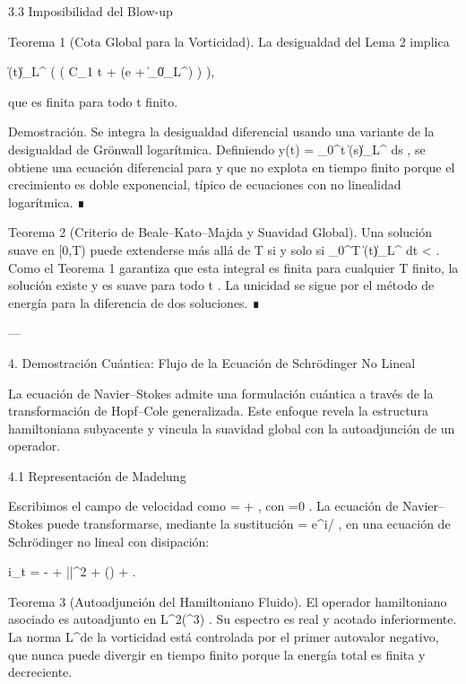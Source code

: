 \documentclass[12pt,twoside]{book}
\begin{document}
3.3 Imposibilidad del Blow-up

Teorema 1 (Cota Global para la Vorticidad).
La desigualdad del Lema 2 implica

\|\boldsymbol{\omega}(t)\|_{L^\infty} \le \exp\left( \exp\left( C_1 t + \ln\ln(e + \|\boldsymbol{\omega}_0\|_{L^\infty}) \right) \right),

que es finita para todo  t  finito.

Demostración. Se integra la desigualdad diferencial usando una variante de la desigualdad de Grönwall logarítmica. Definiendo  y(t) = \int_0^t \|\boldsymbol{\omega}(s)\|_{L^\infty} ds , se obtiene una ecuación diferencial para  y  que no explota en tiempo finito porque el crecimiento es doble exponencial, típico de ecuaciones con no linealidad logarítmica. ∎

Teorema 2 (Criterio de Beale–Kato–Majda y Suavidad Global).
Una solución suave en  [0,T)  puede extenderse más allá de  T  si y solo si  \int_0^T \|\boldsymbol{\omega}(t)\|_{L^\infty} dt < \infty . Como el Teorema 1 garantiza que esta integral es finita para cualquier  T  finito, la solución existe y es suave para todo  t  . La unicidad se sigue por el método de energía para la diferencia de dos soluciones. ∎

---

4. Demostración Cuántica: Flujo de la Ecuación de Schrödinger No Lineal

La ecuación de Navier–Stokes admite una formulación cuántica a través de la transformación de Hopf–Cole generalizada. Este enfoque revela la estructura hamiltoniana subyacente y vincula la suavidad global con la autoadjunción de un operador.

4.1 Representación de Madelung

Escribimos el campo de velocidad como   = \nabla \phi +  , con  \nabla\cdot{}=0 . La ecuación de Navier–Stokes puede transformarse, mediante la sustitución  \psi = \sqrt{\rho} e^{i\phi/\nu} , en una ecuación de Schrödinger no lineal con disipación:

i\nu \partial_t \psi = - \Delta \psi +  ||^2 \psi +  (\nabla\cdot{}) \psi + .

Teorema 3 (Autoadjunción del Hamiltoniano Fluido).
El operador hamiltoniano asociado es autoadjunto en  L^2(^3) . Su espectro es real y acotado inferiormente. La norma  L^\infty  de la vorticidad está controlada por el primer autovalor negativo, que nunca puede divergir en tiempo finito porque la energía total es finita y decreciente.
\end{document}

